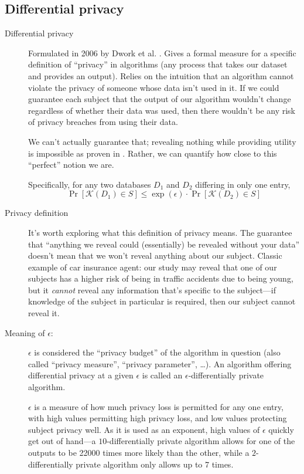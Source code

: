 \documentclass[12pt]{article}
\newcommand{\fancy}{\mathcal}
\begin{document}
\subsection{Differential privacy \label{sec:promise}} 

\begin{description}
    \item[Differential privacy] Formulated in 2006 by Dwork et al. \cite{dworketal2006}. Gives a formal measure for a specific definition of ``privacy'' in algorithms (any process that takes our dataset and provides an output). Relies on the intuition that an algorithm cannot violate the privacy of someone whose data isn't used in it. If we could guarantee each subject that the output of our algorithm wouldn't change regardless of whether their data was used, then there wouldn't be any risk of privacy breaches from using their data.
    
    We can't actually guarantee that; revealing nothing while providing utility is impossible as proven in \cite{dwork2006_diffpriv}. Rather, we can quantify how close to this ``perfect'' notion we are.
    
    Specifically, for any two databases $D_1$ and $D_2$ differing in only one entry,
    \begin{equation}
        \Pr[\fancy{K}(D_1) \in S] \leq \exp(\epsilon) \cdot \Pr[\fancy{K}(D_2) \in S]
    \end{equation}
    
    \item[Privacy definition] It's worth exploring what this definition of privacy means. The guarantee that ``anything we reveal could (essentially) be revealed without your data'' doesn't mean that we won't reveal anything about our subject. Classic example of car insurance agent: our study may reveal that one of our subjects has a higher risk of being in traffic accidents due to being young, but it \emph{cannot} reveal any information that's specific to the subject---if knowledge of the subject in particular is required, then our subject cannot reveal it.
    
    \item[Meaning of $\epsilon$:] $\epsilon$ is considered the ``privacy budget'' of the algorithm in question (also called ``privacy measure'', ``privacy parameter'', \dots). An algorithm offering differential privacy at a given $\epsilon$ is called an $\epsilon$-differentially private algorithm.
    
    $\epsilon$ is a measure of how much privacy loss is permitted for any one entry, with high values permitting high privacy loss, and low values protecting subject privacy well. As it is used as an exponent, high values of $\epsilon$ quickly get out of hand---a $10$-differentially private algorithm allows for one of the outputs to be 22000 times more likely than the other, while a $2$-differentially private algorithm only allows up to 7 times.
    

\end{description}
\end{document}
